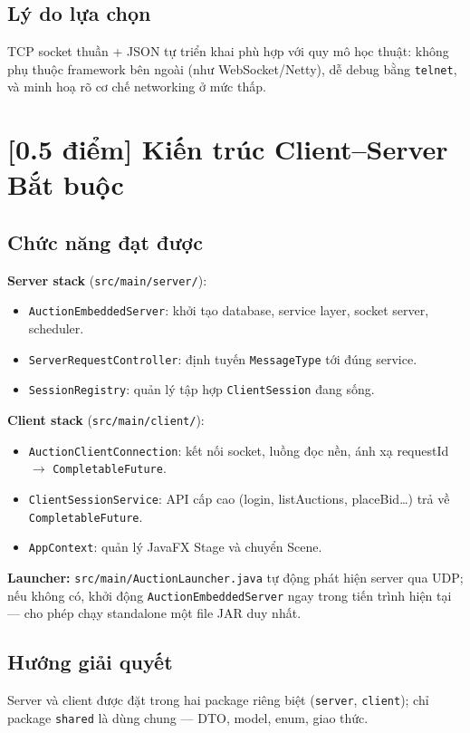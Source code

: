\documentclass[12pt,a4paper]{article}
\newcommand{\score}[1]{\textbf{[#1 điểm]}}
\newcommand{\mandatory}{\textcolor{mandatorycolor}{\textbf{Bắt buộc}}}
\newcommand{\filepath}[1]{\texttt{\small #1}}
\begin{document}
\subsection*{Lý do lựa chọn}
TCP socket thuần + JSON tự triển khai phù hợp với quy mô học thuật: không phụ thuộc framework bên ngoài (như WebSocket/Netty), dễ debug bằng \texttt{telnet}, và minh hoạ rõ cơ chế networking ở mức thấp.

\section{\score{0.5} Kiến trúc Client–Server \hfill \mandatory}

\subsection*{Chức năng đạt được}

\textbf{Server stack} (\filepath{src/main/server/}):
\begin{itemize}[leftmargin=1.5em]
  \item \texttt{AuctionEmbeddedServer}: khởi tạo database, service layer, socket server, scheduler.
  \item \texttt{ServerRequestController}: định tuyến \texttt{MessageType} tới đúng service.
  \item \texttt{SessionRegistry}: quản lý tập hợp \texttt{ClientSession} đang sống.
\end{itemize}

\textbf{Client stack} (\filepath{src/main/client/}):
\begin{itemize}[leftmargin=1.5em]
  \item \texttt{AuctionClientConnection}: kết nối socket, luồng đọc nền, ánh xạ requestId $\to$ \texttt{CompletableFuture}.
  \item \texttt{ClientSessionService}: API cấp cao (login, listAuctions, placeBid…) trả về \texttt{CompletableFuture}.
  \item \texttt{AppContext}: quản lý JavaFX Stage và chuyển Scene.
\end{itemize}

\textbf{Launcher:} \filepath{src/main/AuctionLauncher.java} tự động phát hiện server qua UDP; nếu không có, khởi động \texttt{AuctionEmbeddedServer} ngay trong tiến trình hiện tại — cho phép chạy standalone một file JAR duy nhất.

\subsection*{Hướng giải quyết}
Server và client được đặt trong hai package riêng biệt (\texttt{server}, \texttt{client}); chỉ package \texttt{shared} là dùng chung — DTO, model, enum, giao thức.
\end{document}

